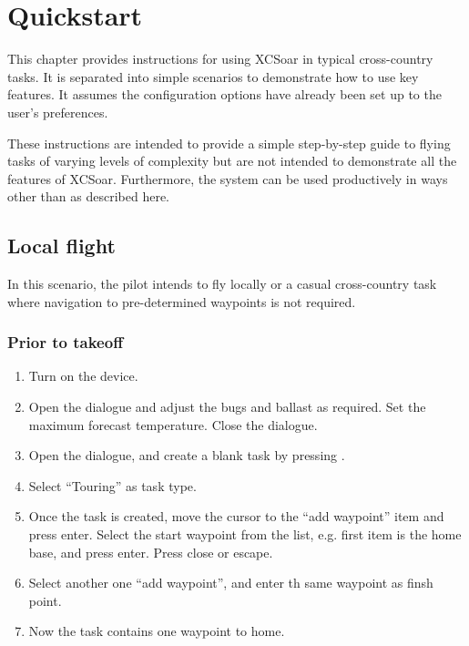 \chapter{Quickstart}\label{cha:quickstart}

This chapter provides instructions for using XCSoar in typical
cross-country tasks.  It is separated into simple scenarios to
demonstrate how to use key features.  It assumes the configuration
options have already been set up to the user's preferences.

These instructions are intended to provide a simple step-by-step guide
to flying tasks of varying levels of complexity but are not intended
to demonstrate all the features of XCSoar.  Furthermore, the system
can be used productively in ways other than as described here.

\section{Local flight}\label{sec:local-flight}

In this scenario, the pilot intends to fly locally or a casual
cross-country task where navigation to pre-determined waypoints is not
required.

\subsection*{Prior to takeoff}
\begin{enumerate}
\item  Turn on the device.
\item  Open the  dialogue and adjust the bugs and ballast as
  required. Set the maximum forecast temperature.  Close the dialogue.
\item  Open the  dialogue, and create a blank task by pressing
.
\item  Select ``Touring'' as  task type.
\item  Once the task is created, move the cursor to the ``add waypoint'' item
  and press enter.  Select the start waypoint from the list, e.g. first item is 
  the home base, and press enter.
  Press close or escape.
\item Select another one ``add waypoint'', and enter th same waypoint as finsh
  point.
\item  Now the task contains one waypoint to home.
\end{enumerate}

